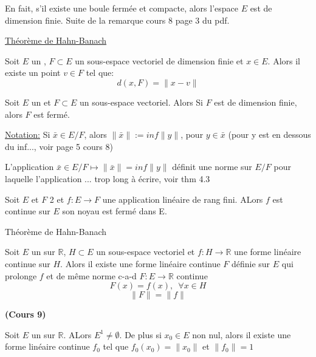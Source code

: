 \documentclass[12pt,a4paper]{article}
\begin{document}
\begin{flushleft}
\begin{rq}
En fait, s'il existe une boule fermée et compacte, alors l'espace $E$ est de dimension finie. Suite de la remarque cours 8 page 3 du pdf.
\end{rq}


\underline{Théorème de Hahn-Banach}
\begin{thm}
Soit $E$ un \evn , $F \subset E$ un sous-espace vectoriel de dimension finie et $x \in E$. Alors il existe un point $v \in F$ tel que: $$d(x,F) = \lVert x - v \rVert$$
\end{thm}


\begin{thm}
Soit $E$ un \evn et $F \subset E$ un sous-espace vectoriel. Alors Si $F$ est de dimension finie, alors $F$ est fermé.
\end{thm}

\underline{Notation:}
Si $\bar{x} \in E/F$, alors $\lVert \bar{x} \rVert := inf \lVert y \rVert$, pour $y \in \bar{x}$ (pour y est en dessous du inf..., voir page 5 cours 8)

\begin{thm}
L'application $\bar{x} \in E/F \mapsto \lVert \bar{x} \rVert = inf \lVert y \rVert$ définit une norme sur $E/F$ pour laquelle l'application ... trop long à écrire, voir thm 4.3
\end{thm}

\begin{thm}
Soit $E$ et $F$ 2 \evn et $f: E \longrightarrow F$ une application linéaire de rang fini. ALors $f$ est continue sur $E$ \ssi son noyau est fermé dans E.
\end{thm}

Théorème de Hahn-Banach
\begin{thm}
Soit $E$ un \evn sur $\mathbb{R}$, $H \subset E$ un sous-espace vectoriel et $f: H \longrightarrow \mathbb{R}$ une forme linéaire continue sur $H$. Alors il existe une forme linéaire continue $F$ définie sur $E$ qui prolonge $f$ et de même norme c-a-d $F: E \longrightarrow \mathbb{R}$ continue $$F(x) = f(x), \enspace \forall x \in H$$ $$\lVert F \rVert = \lVert f \rVert $$
\end{thm}


\textbf{(Cours 9)}



\begin{cor}
Soit $E$ un \evn sur $\mathbb{R}$. ALors $E^1 \neq \emptyset$. De plus si $x_0 \in E$ non nul, alors il existe une forme linéaire continue $f_0$ tel que $f_0 (x_0) = \lVert x_0 \rVert$ et $\lVert f_0 \rVert = 1$
\end{cor}


\end{flushleft}
\end{document}

